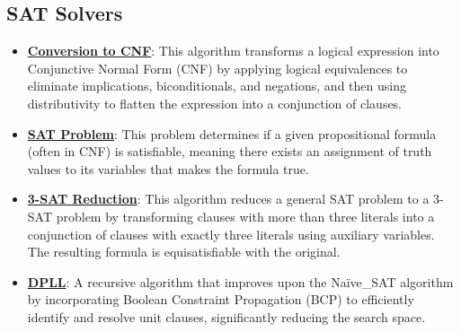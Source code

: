 \documentclass{article}%
\begin{document}
\subsection{SAT Solvers}%
\label{subsec:SATSolvers}%
\begin{itemize}[leftmargin=*]%
\item \href{https://purdue.brightspace.com/d2l/common/assets/pdfjs-d2l-dist/1.0.14-legacy/web/viewer.html?file=\%2Fcontent\%2Fenforced\%2F1095467-wl.202510.CS.24300.001\%2F13L1-Logic.pdf\%3Fou\%3D1095467\&lang=en-us\&container=d2l-fileviewer-rendered-pdf\&fullscreen=d2l-fileviewer-rendered-pdf-dialog\&height=667#page=17}{\textbf{Conversion to CNF}}: This algorithm transforms a logical expression into Conjunctive Normal Form (CNF) by applying logical equivalences to eliminate implications, biconditionals, and negations, and then using distributivity to flatten the expression into a conjunction of clauses.%
\item \href{https://purdue.brightspace.com/d2l/common/assets/pdfjs-d2l-dist/1.0.14-legacy/web/viewer.html?file=\%2Fcontent\%2Fenforced\%2F1095467-wl.202510.CS.24300.001\%2F13L1-Logic.pdf\%3Fou\%3D1095467\&lang=en-us\&container=d2l-fileviewer-rendered-pdf\&fullscreen=d2l-fileviewer-rendered-pdf-dialog\&height=667#page=15}{\textbf{SAT Problem}}: This problem determines if a given propositional formula (often in CNF) is satisfiable, meaning there exists an assignment of truth values to its variables that makes the formula true.%
\item \href{https://purdue.brightspace.com/d2l/common/assets/pdfjs-d2l-dist/1.0.14-legacy/web/viewer.html?file=\%2Fcontent\%2Fenforced\%2F1095467-wl.202510.CS.24300.001\%2F13L1-Logic.pdf\%3Fou\%3D1095467\&lang=en-us\&container=d2l-fileviewer-rendered-pdf\&fullscreen=d2l-fileviewer-rendered-pdf-dialog\&height=667#page=24}{\textbf{3-SAT Reduction}}: This algorithm reduces a general SAT problem to a 3-SAT problem by transforming clauses with more than three literals into a conjunction of clauses with exactly three literals using auxiliary variables. The resulting formula is equisatisfiable with the original.%
\item \href{https://purdue.brightspace.com/d2l/common/assets/pdfjs-d2l-dist/1.0.14-legacy/web/viewer.html?file=\%2Fcontent\%2Fenforced\%2F1095467-wl.202510.CS.24300.001\%2F15L2-SAT.pdf\%3Fou\%3D1095467\&lang=en-us\&container=d2l-fileviewer-rendered-pdf\&fullscreen=d2l-fileviewer-rendered-pdf-dialog\&height=667#page=17}{\textbf{DPLL}}: A recursive algorithm that improves upon the Naïve\_SAT algorithm by incorporating Boolean Constraint Propagation (BCP) to efficiently identify and resolve unit clauses, significantly reducing the search space.%

\end{itemize}
\end{document}
